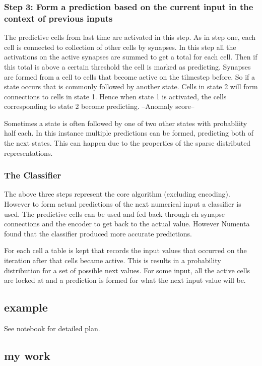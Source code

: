 \documentclass[a4paper]{jpconf}
\begin{document}
		\subsubsection{Step 3: Form a prediction based on the current input in the context of previous inputs}\label{step3}
		The predictive cells from last time are activated in this step. As in step one, each cell is connected to collection of other cells by synapses. In this step all the activations on the active synapses are summed to get a total for each cell. Then if this total is above a certain threshold the cell is marked as predicting. Synapses are formed from a cell to cells that become active on the tilmestep before. So if a state occurs that is commonly followed by another state. Cells in state 2 will form connections to cells in state 1. Hence when state 1 is activated, the cells corresponding to state 2 become predicting.
		--Anomaly score--
		
		Sometimes a state is often followed by one of two other states with probabliity half each. In this instance multiple predictions can be formed, predicting both of the next states. This can happen due to the properties of the sparse distributed representations.
		\subsubsection{The Classifier}
			The above three steps represent the core algorithm (excluding encoding). However to form actual predictions of the next numerical input a classifier is used. The predictive cells can be used and fed back through eh synapse connections and the encoder to get back to the actual value. However Numenta found that the classifier produced more accurate predictions.
			
			For each cell a table is kept that records the input values that occurred on the iteration after that cells became active. This is results in a probability distribution for a set of possible next values. For some input, all the active cells are locked at and a prediction is formed for what the next input value will be.
			 
	\subsection{example}
		See notebook for detailed plan.
	
	\subsection{my work}
\end{document}
